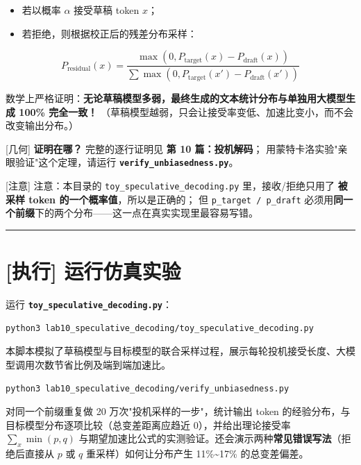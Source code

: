 \begin{itemize}
  \item 若以概率 $\alpha$ 接受草稿 token $x$；
  \item 若拒绝，则根据校正后的残差分布采样：
\end{itemize}

\[
P_{\text{residual}}(x) = \frac{\max(0, P_{\text{target}}(x) - P_{\text{draft}}(x))}{\sum \max(0, P_{\text{target}}(x') - P_{\text{draft}}(x'))}
\]

数学上严格证明：\textbf{无论草稿模型多弱，最终生成的文本统计分布与单独用大模型生成 100\% 完全一致！}
（草稿模型越弱，只会让接受率变低、加速比变小，而不会改变输出分布。）

\begin{mathBox}[核心数学定理推导]
{}[几何] \textbf{证明在哪？} 完整的逐行证明见 \textbf{第 10 篇：投机解码}；
用蒙特卡洛实验"亲眼验证"这个定理，请运行 \textbf{\texttt{verify\_unbiasedness.py}}。

{}[注意] 注意：本目录的 \texttt{toy\_speculative\_decoding.py} 里，接收/拒绝只用了 \textbf{被采样 token 的一个概率值}，所以是正确的；
但 \texttt{p\_target / p\_draft} 必须用\textbf{同一个前缀}下的两个分布——这一点在真实实现里最容易写错。
\end{mathBox}

\vspace{0.8em}\hrule\vspace{0.8em}

\section{[执行] 运行仿真实验}

运行 \textbf{\texttt{toy\_speculative\_decoding.py}}：

\begin{lstlisting}[language=bash]
python3 lab10_speculative_decoding/toy_speculative_decoding.py
\end{lstlisting}

本脚本模拟了草稿模型与目标模型的联合采样过程，展示每轮投机接受长度、大模型调用次数节省比例及端到端加速比。

\begin{lstlisting}[language=bash]
python3 lab10_speculative_decoding/verify_unbiasedness.py
\end{lstlisting}

对同一个前缀重复做 20 万次"投机采样的一步"，统计输出 token 的经验分布，与目标模型分布逐项比较（总变差距离应趋近 0），并给出理论接受率 $\sum_x \min(p, q)$ 与期望加速比公式的实测验证。还会演示两种\textbf{常见错误写法}（拒绝后直接从 $p$ 或 $q$ 重采样）如何让分布产生 11\%\textasciitilde{}17\% 的总变差偏差。


